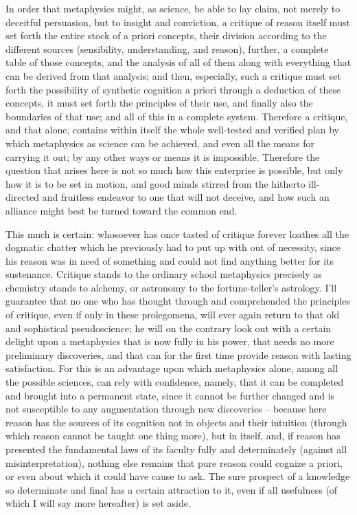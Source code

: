In order that metaphysics might, as science, be able to lay claim, not
merely to deceitful persuasion, but to insight and conviction, a critique
of reason itself must set forth the entire stock of a priori concepts, their
division according to the different sources (sensibility, understanding,
and reason), further, a complete table of those concepts, and the analysis
of all of them along with everything that can be derived from that analysis;
and then, especially, such a critique must set forth the possibility of
synthetic cognition a priori through a deduction of these concepts, it
must set forth the principles of their use, and ﬁnally also the boundaries
of that use; and all of this in a complete system. Therefore a critique, and
that alone, contains within itself the whole well-tested and veriﬁed plan
by which metaphysics as science can be achieved, and even all the means
for carrying it out; by any other ways or means it is impossible. Therefore
the question that arises here is not so much how this enterprise is possible,
but only how it is to be set in motion, and good minds stirred from the
hitherto ill-directed and fruitless endeavor to one that will not deceive,
and how such an alliance might best be turned toward the common end.

This much is certain: whosoever has once tasted of critique forever
loathes all the dogmatic chatter which he previously had to put up with
out of necessity, since his reason was in need of something and could not
ﬁnd anything better for its sustenance. Critique stands to the ordinary
school metaphysics precisely as chemistry stands to alchemy, or astronomy
to the fortune-teller’s astrology. I’ll guarantee that no one who has thought
through and comprehended the principles of critique, even if only in
these prolegomena, will ever again return to that old and sophistical
pseudoscience; he will on the contrary look out with a certain delight
upon a metaphysics that is now fully in his power, that needs no more
preliminary discoveries, and that can for the ﬁrst time provide reason
with lasting satisfaction. For this is an advantage upon which metaphysics
alone, among all the possible sciences, can rely with conﬁdence, namely,
that it can be completed and brought into a permanent state, since it
cannot be further changed and is not susceptible to any augmentation
through new discoveries – because here reason has the sources of its
cognition not in objects and their intuition (through which reason cannot
be taught one thing more), but in itself, and, if reason has presented
the fundamental laws of its faculty fully and determinately (against all
misinterpretation), nothing else remains that pure reason could cognize
a priori, or even about which it could have cause to ask. The sure prospect
of a knowledge so determinate and ﬁnal has a certain attraction to it, even
if all usefulness (of which I will say more hereafter) is set aside.


